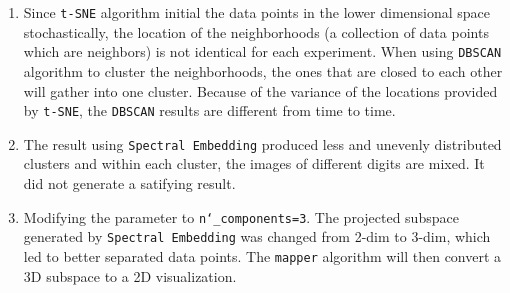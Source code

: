 \documentclass[12pt]{article}
\begin{document}
\begin{enumerate}[start=6, label={\bfseries Q\arabic*:}]
\item Since \texttt{t-SNE} algorithm initial the data points in the lower dimensional space stochastically, the location of the neighborhoods (a collection of data points which are neighbors) is not identical for each experiment. When using \texttt{DBSCAN} algorithm to cluster the neighborhoods, the ones that are closed to each other will gather into one cluster. Because of the variance of the locations provided by \texttt{t-SNE}, the \texttt{DBSCAN} results are different from time to time.
\item The result using \texttt{Spectral Embedding} produced less and unevenly distributed clusters and within each cluster, the images of different digits are mixed. It did not generate a satifying result.
\item Modifying the parameter to \texttt{n\char`_components=3}. The projected subspace generated by \texttt{Spectral Embedding} was changed from 2-dim to 3-dim, which led to better separated data points. The \texttt{mapper} algorithm will then convert a 3D subspace to a 2D visualization.
\end{enumerate}
\end{document}
